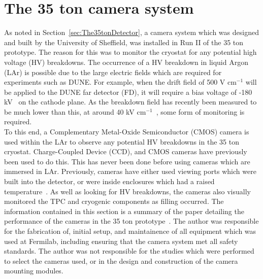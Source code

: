
\chapter{The 35 ton camera system} \label{chap:Cameras} %



\graphicspath{{The35tonCameras/Figs/Raster/}{The35tonCameras/Figs/PDF/}{The35tonCameras/Figs/Vector/}}

As noted in Section~\ref{sec:The35tonDetector}, a camera system which was designed and built by the University of Sheffield, was installed in Run II of the 35 ton prototype. The reason for this was to monitor the cryostat for any potential high voltage (HV) breakdowns. The occurrence of a HV breakdown in liquid Argon (LAr) is possible due to the large electric fields which are required for experiments such as DUNE. For example, when the drift field of 500 V cm$^{-1}$ will be applied to the DUNE far detector (FD), it will require a bias voltage of -180 kV~\citep{DUNECDR_V4} on the cathode plane. As the breakdown field has recently been measured to be much lower than this, at around 40 kV cm$^{-1}$~\citep{BlatterEField}, some form of monitoring is required. \\

To this end, a Complementary Metal-Oxide Semiconductor (CMOS) camera is used within the LAr to observe any potential HV breakdowns in the 35 ton cryostat. Charge-Coupled Device (CCD), and CMOS cameras have previously been used to do this. This has never been done before using cameras which are immersed in LAr. Previously, cameras have either used viewing ports which were built into the detector, or were inside enclosures which had a raised temperature~\citep{BlatterEField,BERNcam,LAPD,Liverpool,Weizmannbubbles}. As well as looking for HV breakdowns, the cameras also visually monitored the TPC and cryogenic components as filling occurred. The information contained in this section is a summary of the paper detailing the performance of the cameras in the 35 ton prototype~\citep{CameraPaper}. The author was responsible for the fabrication of, initial setup, and maintainence of all equipment which was used at Fermilab, including ensuring that the camera system met all safety standards. The author was not responsible for the studies which were performed to select the cameras used, or in the design and construction of the camera mounting modules. \\

